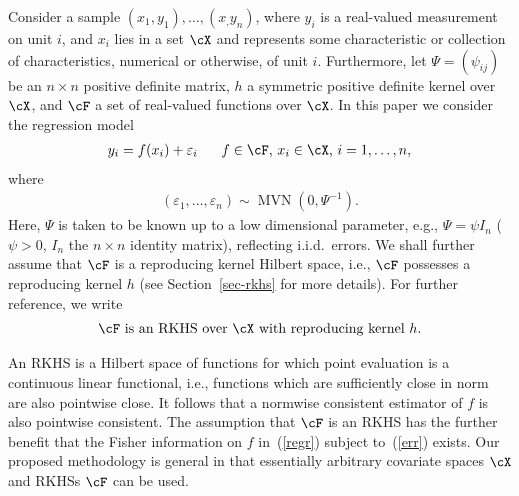 \documentclass[preprint,12pt,authoryear]{elsarticle}
\DeclareMathOperator{\MVN}{MVN}
\def\ve{\varepsilon}
\begin{document}
Consider a sample $(x_1,y_1),\ldots,(x_,y_n)$, where $y_i$ is a real-valued measurement on unit $i$, and $x_i$ lies in a set $\cX$ and represents some characteristic or collection of characteristics, numerical or otherwise, of unit $i$.
Furthermore, let $\Psi=(\psi_{ij})$ be an $n\times n$ positive definite matrix, $h$ a symmetric positive definite kernel over $\cX$, and $\cF$ a set of real-valued functions over $\cX$. 
In this paper we consider the regression model 
\begin{eqnarray}\label{regr}
y_i = f(x_i) + \varepsilon_i  \hspace{6mm}\mbox{$f\in\cF$, $x_i\in\cX$, $i=1,\ldots,n$},
\end{eqnarray}
where 
\begin{eqnarray}\label{err}
(\varepsilon_1,\ldots,\varepsilon_n) \sim \MVN(0,\Psi^{-1}).
\end{eqnarray}
Here, $\Psi$ is taken to be known up to a low dimensional parameter, e.g., $\Psi=\psi I_n$ ($\psi>0$, $I_n$ the $n\times n$ identity matrix), reflecting i.i.d.\  errors.
We shall further assume that $\cF$ is a reproducing kernel Hilbert space, i.e., $\cF$ possesses a reproducing kernel $h$ (see Section~\ref{sec-rkhs} for more details). For further reference, we write
\begin{eqnarray}\label{rk}
\mbox{$\cF$ is an RKHS over $\cX$ with reproducing kernel $h$}.
\end{eqnarray}



An RKHS is a Hilbert space of functions for which point evaluation is a continuous linear functional, i.e., functions which are sufficiently close in norm are also pointwise close. It follows that a normwise consistent estimator of $f$ is also pointwise consistent. 
The assumption that $\cF$ is an RKHS has the further benefit that the Fisher information on $f$ in~(\ref{regr}) subject to~(\ref{err}) exists.
Our proposed methodology is general in that essentially arbitrary covariate spaces $\cX$ and RKHSs $\cF$ can be used.
\end{document}
